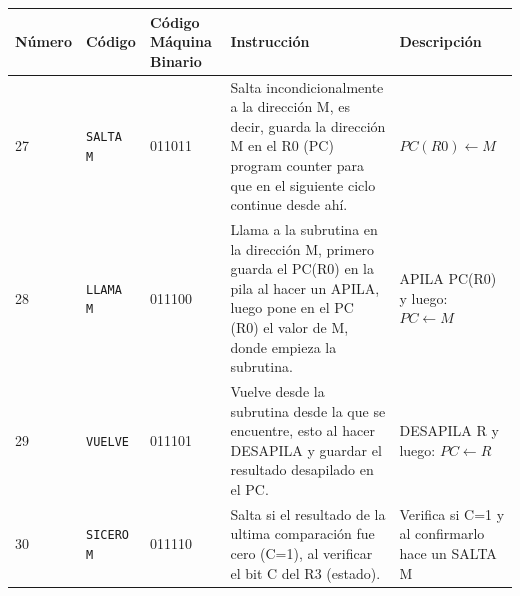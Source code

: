 \documentclass{article}
\begin{document}
\begin{longtable}{|p{}|p{}|p{}|p{}|p{}|}
  \hline
  \textbf{Número}    & \textbf{Código}                                  & \textbf{Código Máquina Binario} & \textbf{Instrucción}                                                                                                                                                                                                          & \textbf{Descripción}                                                                                                   \\
  \hline
  27                 & \texttt{SALTA M}                                 & 011011                          & Salta incondicionalmente a la dirección M, es decir, guarda la dirección M en el R0 (PC) program counter para que en el siguiente ciclo continue desde ahí.                                                                   & $PC(R0) \leftarrow M$                                                                                                  \\
  \hline
  28                 & \texttt{LLAMA M}                                 & 011100                          & Llama a la subrutina en la dirección M, primero guarda el PC(R0) en la pila al hacer un APILA, luego pone en el PC (R0) el valor de M, donde empieza la subrutina.                                                            & APILA PC(R0) y luego: $PC \leftarrow M$                                                                                \\
  \hline
  29                 & \texttt{VUELVE}                                  & 011101                          & Vuelve desde la subrutina desde la que se encuentre, esto al hacer DESAPILA y guardar el resultado desapilado en el PC.                                                                                                       & DESAPILA R y luego: $PC \leftarrow R$                                                                                  \\
  \hline
  30                 & \texttt{SICERO M}                                & 011110                          & Salta si el resultado de la ultima comparación fue cero (C=1), al verificar el bit
  C del R3 (estado). & Verifica si C=1 y al confirmarlo hace un SALTA M                                                                                                                                                                                                                                                                                                                                                                                            \\

\end{longtable}
\end{document}
